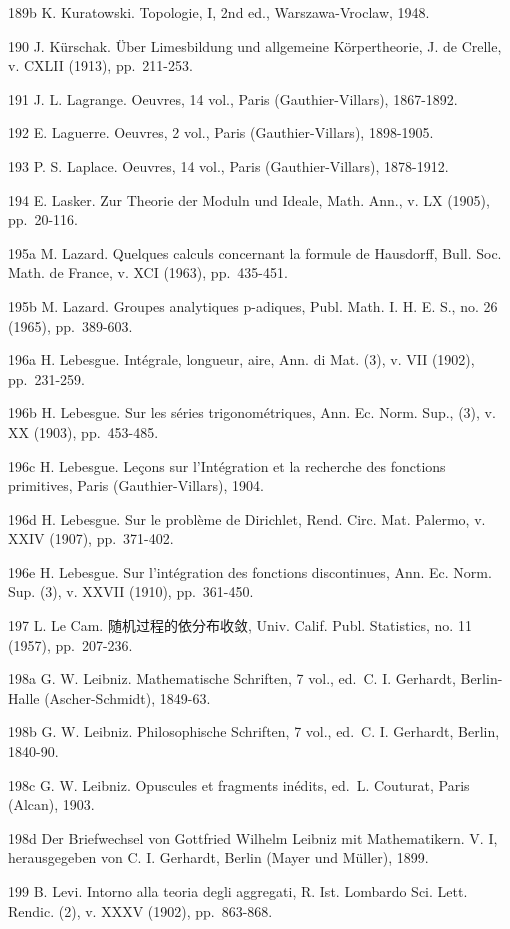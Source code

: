 189b K. Kuratowski. Topologie, I, 2nd ed., Warszawa-Vroclaw, 1948.

190 J. Kürschak. Über Limesbildung und allgemeine Körpertheorie, J. de Crelle, v. CXLII (1913), pp.~211-253.

191 J. L. Lagrange. Oeuvres, 14 vol., Paris (Gauthier-Villars), 1867-1892.

192 E. Laguerre. Oeuvres, 2 vol., Paris (Gauthier-Villars), 1898-1905.

193 P. S. Laplace. Oeuvres, 14 vol., Paris (Gauthier-Villars), 1878-1912.

194 E. Lasker. Zur Theorie der Moduln und Ideale, Math. Ann., v. LX (1905), pp.~20-116.

195a M. Lazard. Quelques calculs concernant la formule de Hausdorff, Bull. Soc. Math. de France, v. XCI (1963), pp.~435-451.

195b M. Lazard. Groupes analytiques p-adiques, Publ. Math. I. H. E. S., no. 26 (1965), pp.~389-603.

196a H. Lebesgue. Intégrale, longueur, aire, Ann. di Mat. (3), v. VII (1902), pp.~231-259.

196b H. Lebesgue. Sur les séries trigonométriques, Ann. Ec. Norm. Sup., (3), v. XX (1903), pp.~453-485.

196c H. Lebesgue. Leçons sur l'Intégration et la recherche des fonctions primitives, Paris (Gauthier-Villars), 1904.

196d H. Lebesgue. Sur le problème de Dirichlet, Rend. Circ. Mat. Palermo, v. XXIV (1907), pp.~371-402.

196e H. Lebesgue. Sur l'intégration des fonctions discontinues, Ann. Ec. Norm. Sup. (3), v. XXVII (1910), pp.~361-450.

197 L. Le Cam. 随机过程的依分布收敛, Univ. Calif. Publ. Statistics, no. 11 (1957), pp.~207-236.

198a G. W. Leibniz. Mathematische Schriften, 7 vol., ed.~C. I. Gerhardt, Berlin-Halle (Ascher-Schmidt), 1849-63.

198b G. W. Leibniz. Philosophische Schriften, 7 vol., ed.~C. I. Gerhardt, Berlin, 1840-90.

198c G. W. Leibniz. Opuscules et fragments inédits, ed.~L. Couturat, Paris (Alcan), 1903.

198d Der Briefwechsel von Gottfried Wilhelm Leibniz mit Mathematikern. V. I, herausgegeben von C. I. Gerhardt, Berlin (Mayer und Müller), 1899.

199 B. Levi. Intorno alla teoria degli aggregati, R. Ist. Lombardo Sci. Lett. Rendic. (2), v. XXXV (1902), pp.~863-868.

